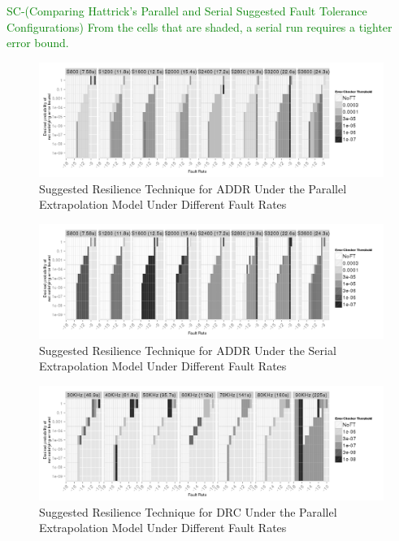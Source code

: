 \documentclass{sig-alternate}
\newcommand{\sui}[1]{%
  \textcolor{green}{SC-#1}
}
\begin{document}
\sui{(Comparing Hattrick's Parallel and Serial Suggested Fault Tolerance Configurations)
From the cells that are shaded, a serial run requires a tighter error bound.}

\begin{figure}[ht!]
\centering
\includegraphics[width=7in]{figs/Lasso_Parallel_SuggestedConf.png}
\vspace{-10pt}
\caption{Suggested Resilience Technique for ADDR Under the Parallel Extrapolation Model Under Different Fault Rates}
\vspace{-10pt}
\label{fig:Lasso_Parallel_SuggestedConf}
\end{figure}

\begin{figure}[ht!]
\centering
\includegraphics[width=7in]{figs/Lasso_Serial_SuggestedConf.png}
\vspace{-10pt}
\caption{Suggested Resilience Technique for ADDR Under the Serial Extrapolation Model Under Different Fault Rates}
\vspace{-10pt}
\label{fig:Lasso_Serial_SuggestedConf}
\end{figure}

\begin{figure}[ht!]
\centering
\includegraphics[width=7in]{figs/DRC_Parallel_SuggestedConf.png}
\vspace{-10pt}
\caption{Suggested Resilience Technique for DRC Under the Parallel Extrapolation Model Under Different Fault Rates}
\vspace{-10pt}
\label{fig:DRC_Parallel_SuggestedConf}
\end{figure}
\end{document}
